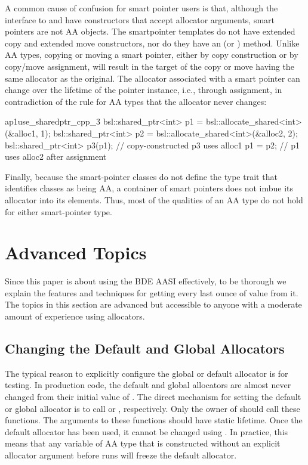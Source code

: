 A common cause of confusion for smart pointer users is that, although the
interface to  and  have constructors that
accept allocator arguments, smart pointers are not AA objects. The smartpointer templates do not have extended copy and extended move constructors,
nor do they have an  (or ) method. Unlike AA
types, copying or moving a smart pointer, either by copy construction or by
copy/move assignment, will result in the target of the copy or move having the
same allocator as the original. The allocator associated with a smart pointer
can change over the lifetime of the pointer instance, i.e., through assignment,
in contradiction of the rule for AA types that the allocator never changes:
\begin{cppcodeblock}{ap1use_sharedptr_cpp_3}
    bsl::shared_ptr<int> p1 = bsl::allocate_shared<int>(&alloc1, 1);
    bsl::shared_ptr<int> p2 = bsl::allocate_shared<int>(&alloc2, 2);
    bsl::shared_ptr<int> p3(p1); // copy-constructed p3 uses alloc1
    p1 = p2; // p1 uses alloc2 after assignment
\end{cppcodeblock}
Finally, because the smart-pointer classes do not define the
 type trait that identifies classes as being AA, a
container of smart pointers does not imbue its allocator into its elements.
Thus, most of the qualities of an AA type do not hold for either smart-pointer
type.

\section{Advanced Topics}
Since this paper is about using the BDE AASI effectively, to be thorough we
explain the features and techniques for getting every last ounce of value from
it. The topics in this section are advanced but accessible to anyone with a
moderate amount of experience using allocators.

\subsection{Changing the Default and Global Allocators}
The typical reason to explicitly configure the global or default allocator is for
testing. In production code, the default and global allocators are almost never
changed from their initial value of .
The direct mechanism for setting the default or global allocator is to call
 or
, respectively. Only the owner of 
should call these functions. The arguments to these functions should have
static lifetime. Once the default allocator has been used, it cannot be changed
using . In practice, this means that any variable of AA
type that is constructed without an explicit allocator argument before 
runs will freeze the default allocator.

